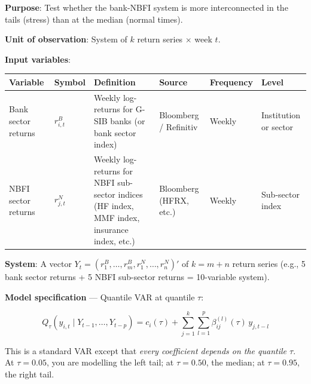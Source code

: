 \documentclass[11pt,a4paper]{article}
\begin{document}
\textbf{Purpose}: Test whether the bank-NBFI system is more interconnected in the tails (stress) than at the median (normal times).

\textbf{Unit of observation}: System of $k$ return series $\times$ week $t$.

\textbf{Input variables}:


{\small
\begin{longtable}{|p{}|p{}|p{}|p{}|p{}|p{}|}
\hline
\textbf{Variable} & \textbf{Symbol} & \textbf{Definition} & \textbf{Source} & \textbf{Frequency} & \textbf{Level} \\
\hline
\endhead
Bank sector returns & $r_{i,t}^B$ & Weekly log-returns for G-SIB banks (or bank sector index) & Bloomberg / Refinitiv & Weekly & Institution or sector \\
\hline
NBFI sector returns & $r_{j,t}^N$ & Weekly log-returns for NBFI sub-sector indices (HF index, MMF index, insurance index, etc.) & Bloomberg (HFRX, etc.) & Weekly & Sub-sector index \\
\hline
\end{longtable}
}

\textbf{System}: A vector $Y_t = (r_1^B, \ldots, r_m^B, r_1^N, \ldots, r_n^N)'$ of $k = m + n$ return series (e.g., 5 bank sector returns + 5 NBFI sub-sector returns = 10-variable system).

\textbf{Model specification} --- Quantile VAR at quantile $\tau$:

\[Q_{\tau}(y_{i,t} \mid Y_{t-1}, \ldots, Y_{t-p}) = c_i(\tau) + \sum_{j=1}^{k} \sum_{l=1}^{p} \beta_{ij}^{(l)}(\tau) \, y_{j,t-l}\]

This is a standard VAR except that \textit{every coefficient depends on the quantile $\tau$}. At $\tau = 0.05$, you are modelling the left tail; at $\tau = 0.50$, the median; at $\tau = 0.95$, the right tail.
\end{document}
